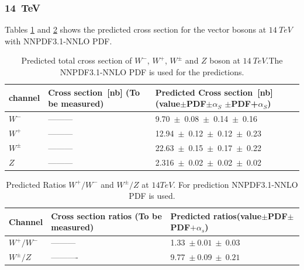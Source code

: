 \subsubsection{14~TeV}
Tables \ref{14_tab} and \ref{14_tab1} shows the predicted cross section for the vector bosons at $14~TeV$ with NNPDF3.1-NNLO PDF. 
\begin{table}[H]
\centering
\caption{Predicted total cross section of $W^{-}$, $W^{+}$, $W^{\pm}$ and $Z$ boson at $14~TeV$.The NNPDF3.1-NNLO PDF is used for the predictions.}
\begin{tabular}{|l|p{6cm}|p{6cm}| }
\hline
channel&\bf Cross section~[nb] \newline (To be measured) &\bf Predicted Cross section~[nb]\newline (value$\pm$PDF$\pm\alpha_{S}$ $\pm$PDF+$\alpha_{S}$)\\
\hline
\hline
$W^{-}$&---------&9.70~$\pm$~0.08~$\pm$~0.14~$\pm$~0.16\\
$W^{+}$&---------&12.94~$\pm$~0.12~$\pm$~0.12~$\pm$~0.23\\
$W^{\pm}$&---------&22.63~$\pm$~0.15~$\pm$~0.17~$\pm$~0.22\\
\hline
\hline
$Z$&---------&2.316~$\pm$~0.02~$\pm$~0.02~$\pm$~0.02\\
\hline
\end{tabular}
\label{14_tab}
\end{table}

\begin{table}[H]
\centering
\caption{Predicted Ratios $W^{+}/W^{-}$ and $W^{\pm}/Z$ at $14TeV$. For prediction NNPDF3.1-NNLO PDF is used.} 
\begin{tabular}{|l|p{6cm}|p{6cm}|}
\hline
Channel&\bf Cross section ratios \newline (To be measured) &\bf Predicted ratios\newline(value$\pm$PDF$\pm$PDF$+\alpha_{s}$)\\
\hline
\hline
$W^{+}/W^{-}$&---------&1.33~$\pm~0.01~\pm~0.03$\\
$W^{\pm}/Z$&----------&9.77~$\pm~0.09~\pm~0.21$\\
\hline
\end{tabular}
\label{14_tab1}
\end{table}


